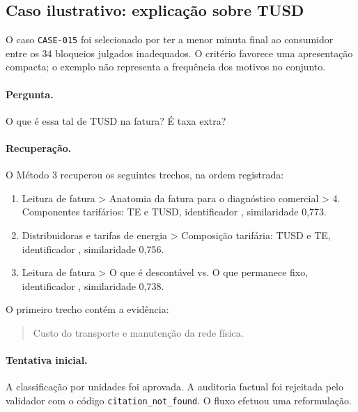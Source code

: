 
\subsection{Caso ilustrativo: explicação sobre TUSD}

\label{sec:caso_ilustrativo}

O caso \texttt{CASE-015} foi selecionado por ter a menor minuta final ao consumidor entre os 34 bloqueios julgados inadequados. O critério favorece uma apresentação compacta; o exemplo não representa a frequência dos motivos no conjunto.

\paragraph*{Pergunta.} O que é essa tal de TUSD na fatura? É taxa extra?

\paragraph*{Recuperação.} O Método 3 recuperou os seguintes trechos, na ordem registrada:

\begin{enumerate}

\item Leitura de fatura > Anatomia da fatura para o diagnóstico comercial > 4. Componentes tarifários: TE e TUSD, identificador , similaridade 0,773.

\item Distribuidoras e tarifas de energia > Composição tarifária: TUSD e TE, identificador , similaridade 0,756.

\item Leitura de fatura > O que é descontável vs. O que permanece fixo, identificador , similaridade 0,738.

\end{enumerate}

O primeiro trecho contém a evidência:

\begin{quote}Custo do transporte e manutenção da rede física.\end{quote}

\paragraph*{Tentativa inicial.} A classificação por unidades foi aprovada. A auditoria factual foi rejeitada pelo validador com o código \texttt{citation\_not\_found}. O fluxo efetuou uma reformulação.

